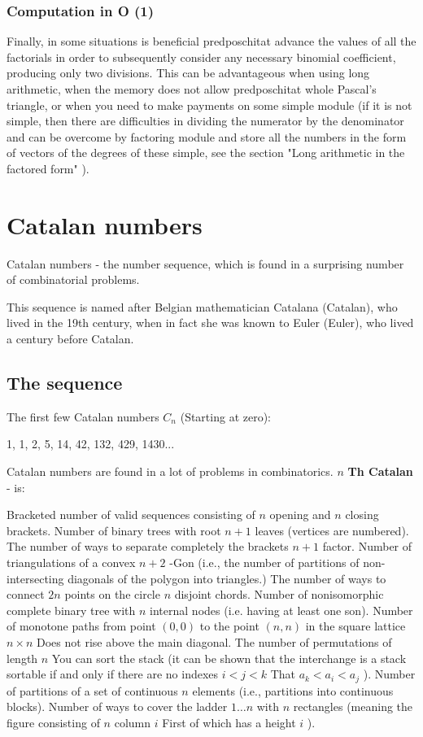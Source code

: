 \subsubsection{ Computation in O (1) }

Finally, in some situations is beneficial predposchitat advance the values ​​of all the factorials in order to subsequently consider any necessary binomial coefficient, producing only two divisions. This can be advantageous when using long arithmetic, when the memory does not allow predposchitat whole Pascal's triangle, or when you need to make payments on some simple module (if it is not simple, then there are difficulties in dividing the numerator by the denominator and can be overcome by factoring module and store all the numbers in the form of vectors of the degrees of these simple, see the section "Long arithmetic in the factored form" ).

\section{ Catalan numbers }
Catalan numbers - the number sequence, which is found in a surprising number of combinatorial problems.

This sequence is named after Belgian mathematician Catalana (Catalan), who lived in the 19th century, when in fact she was known to Euler (Euler), who lived a century before Catalan.

\subsection{ The sequence }

The first few Catalan numbers $C_n$ (Starting at zero):

1, 1, 2, 5, 14, 42, 132, 429, 1430...

Catalan numbers are found in a lot of problems in combinatorics. \textbf{$n$} \textbf{Th Catalan} - is:

Bracketed number of valid sequences consisting of $n$ opening and $n$ closing brackets.
Number of binary trees with root $n +1$ leaves (vertices are numbered).
The number of ways to separate completely the brackets $n +1$ factor.
Number of triangulations of a convex $n +2$ -Gon (i.e., the number of partitions of non-intersecting diagonals of the polygon into triangles.)
The number of ways to connect $2n$ points on the circle $n$ disjoint chords.
Number of nonisomorphic complete binary tree with $n$ internal nodes (i.e. having at least one son).
Number of monotone paths from point $(0,0)$ to the point $(n, n)$ in the square lattice $n \times n$ Does not rise above the main diagonal.
The number of permutations of length $n$ You can sort the stack (it can be shown that the interchange is a stack sortable if and only if there are no indexes $i <j <k$ That $a_k <a_i <a_j$ ).
Number of partitions of a set of continuous $n$ elements (i.e., partitions into continuous blocks).
Number of ways to cover the ladder $1 \ldots n$ with $n$ rectangles (meaning the figure consisting of $n$ column $i$ First of which has a height $i$ ).

